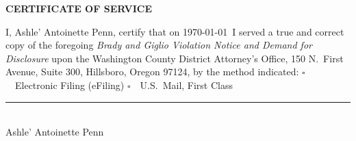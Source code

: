 \documentclass[12pt,letterpaper]{extarticle}
\begin{document}
	\newpage
	\begin{center}{\fontsize{11}{13}\bfseries\selectfont CERTIFICATE OF SERVICE}
	\end{center}
	\vspace{12pt}
	I, Ashle' Antoinette Penn, certify that on \today\ I served a true and correct
	copy of the foregoing \textit{Brady and Giglio Violation Notice and Demand for
		Disclosure} upon the Washington County District Attorney's Office,
	150 N.\ First Avenue, Suite 300, Hillsboro, Oregon 97124, by the method indicated:
	\vspace{12pt}
	\noindent\hspace{0.5in}$\square$\ \ Electronic Filing (eFiling)
	\hspace{0.8in}
	$\square$\ \ U.S.\ Mail, First Class
	\vspace{36pt}
	\noindent\hspace{0.5in}\rule{2.5in}{0.4pt}\\[4pt]
	\noindent\hspace{0.5in}Ashle' Antoinette Penn
	
\end{document}
